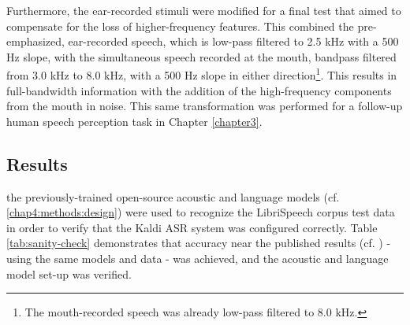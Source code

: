 Furthermore, the ear-recorded stimuli were modified for a final test that aimed to compensate for the loss of higher-frequency features.  This combined the pre-emphasized, ear-recorded speech, which is low-pass filtered to 2.5 kHz with a 500 Hz slope, with the simultaneous speech recorded at the mouth, bandpass filtered from 3.0 kHz to 8.0 kHz, with a 500 Hz slope in either direction\footnote{The mouth-recorded speech was already low-pass filtered to 8.0 kHz.}. This results in full-bandwidth information with the addition of the high-frequency components from the mouth in noise. 
This same transformation was performed for a follow-up human speech perception task in Chapter \ref{chapter3}.







\subsection{Results}
\label{chap4:results}

the previously-trained open-source acoustic and language models (cf. \ref{chap4:methods:design}) were used to recognize the LibriSpeech corpus test data in order to verify that the Kaldi ASR system was configured correctly.  Table \ref{tab:sanity-check} demonstrates that accuracy near the published results (cf. \cite{panayotov:15}) - using the same models and data - was achieved, and the acoustic and language model set-up was verified.

